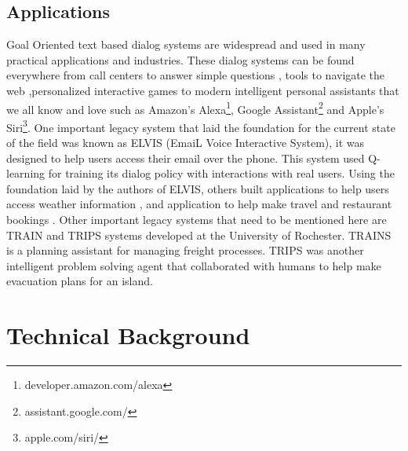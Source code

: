 \documentclass[14pt]{extarticle}
\numberwithin{equation}{section}
\begin{document}
	\subsection{Applications}
	Goal Oriented text based dialog systems are widespread and used in many practical applications and industries. These dialog systems can be found everywhere from call centers to answer simple questions \cite{georgila1998integrated}, tools to navigate the web \cite{chai2001natural} ,personalized interactive games\cite{su2013dialoguegame} to modern intelligent personal assistants that we all know and love such as Amazon's Alexa\footnote{developer.amazon.com/alexa}, Google Assistant\footnote{assistant.google.com/} and Apple's Siri\footnote{apple.com/siri/}. One important legacy system that laid the foundation for the current state of the field was known as ELVIS (EmaiL Voice Interactive System), it was designed to help users access their email over the phone\cite{ELVIS}. This system used Q-learning for training its dialog policy with interactions with real users. Using the foundation laid by the authors of ELVIS, others built applications to help users access weather information \cite{zue_jupiter}, and application to help make travel and restaurant bookings \cite{Shriver_unified}. Other important legacy systems that need to be mentioned here are TRAIN\cite{TRAIN} and TRIPS\cite{ferguson1998trips} systems developed at the University of Rochester. TRAINS is a planning assistant for managing freight processes. TRIPS was another intelligent problem solving agent that collaborated with humans to help make evacuation plans for an island.
	
	\pagebreak
	\section{Technical Background}
\end{document}
